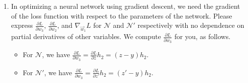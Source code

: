 \documentclass[10pt]{article}
\theoremstyle{definition}
\theoremstyle{plain}
\newcommand{\RR}{\mathbb{R}}
\begin{document}
\begin{enumerate}[label=(\alph*)]
That is, we define a new neural network $\mathcal{N}'$ with parameters $(\vec{w}_1, w_2, w_3) \in \RR^d \times \RR \times \RR$ as follows.
\begin{align}
p_1 &= \vec{w}_1^\top \vec{x} \\
h_1 &= \sigma(p_1) \\
p_2 &= w_2 h_1 \\
h_2 &= \sigma(p_2) \\
z' &= w_3 h_2 + h_1.
\end{align}

This introduces a change in the network architecture, called the \emph{skip connection}.

Again, compute the following gradients and partial derivatives with respect to the loss function $L(y, z') = \frac{1}{2}(y - z')^2$:
\begin{equation}
\frac{\partial L}{\partial z'}, \quad \frac{\partial L}{\partial w_3}, \quad \frac{\partial L}{\partial h_2}, \quad \frac{\partial L}{\partial p_2}, \quad \frac{\partial L}{\partial w_2}, \quad \frac{\partial L}{\partial h_1}, \quad \frac{\partial L}{\partial p_1}, \quad \nabla_{\vec{w}_1} L, \quad \nabla_{\vec{x}} L.
\end{equation}

We compute the first 4 derivatives for you.
\begin{equation}
\frac{\partial L}{\partial z'} = z' - y, \quad \frac{\partial L}{\partial w_3} = \frac{\partial L}{\partial z'} h_2, \quad \frac{\partial L}{\partial h_2} = \frac{\partial L}{\partial z'} w_3, \quad \frac{\partial L}{\partial p_2} = \frac{\partial L}{\partial h_2} \sigma'(p_2).
\end{equation}

Use the chain rule to calculate the 5 remaining derivatives $\frac{\partial L}{\partial w_2}$, $\frac{\partial L}{\partial h_1}$, $\frac{\partial L}{\partial p_1}$, $\nabla_{\vec{w}_1} L$, and $\nabla_{\vec{x}} L$.

\item In optimizing a neural network using gradient descent, we need the gradient of the loss function with respect to the parameters of the network. Please express $\frac{\partial L}{\partial w_3}$, $\frac{\partial L}{\partial w_2}$, and $\nabla_{\vec{w}_1} L$ for $\mathcal{N}$ and $\mathcal{N}'$ respectively with no dependence on partial derivatives of other variables. We compute $\frac{\partial L}{\partial w_3}$ for you, as follows.

\begin{itemize}
    \item For $\mathcal{N}$, we have $\frac{\partial L}{\partial w_3} = \frac{\partial L}{\partial z} h_2 = (z - y) h_2$.
    \item For $\mathcal{N}'$, we have $\frac{\partial L}{\partial w_3} = \frac{\partial L}{\partial z'} h_2 = (z' - y) h_2$.
\end{itemize}


\end{enumerate}
\end{document}
